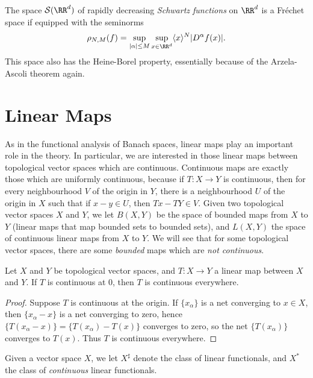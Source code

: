 \begin{example}
    The space $\mathcal{S}(\RR^d)$ of rapidly decreasing \emph{Schwartz functions} on $\RR^d$ is a Fr\'{e}chet space if equipped with the seminorms
    \[ \rho_{N,M}(f) = \sup_{|\alpha| \leq M} \sup_{x \in \RR^d} \langle x \rangle^N |D^\alpha f(x)|. \]
    This space also has the Heine-Borel property, essentially because of the Arzela-Ascoli theorem again.
\end{example}







\section{Linear Maps}

As in the functional analysis of Banach spaces, linear maps play an important role in the theory. In particular, we are interested in those linear maps between topological vector spaces which are continuous. Continuous maps are exactly those which are uniformly continuous, because if $T: X \to Y$ is continuous, then for every neighbourhood $V$ of the origin in $Y$, there is a neighbourhood $U$ of the origin in $X$ such that if $x - y \in U$, then $Tx - TY \in V$. Given two topological vector spaces $X$ and $Y$, we let $B(X,Y)$ be the space of bounded maps from $X$ to $Y$ (linear maps that map bounded sets to bounded sets), and $L(X,Y)$ the space of continuous linear maps from $X$ to $Y$. We will see that for some topological vector spaces, there are some \emph{bounded} maps which are \emph{not continuous}.

\begin{lemma}
    Let $X$ and $Y$ be topological vector spaces, and $T: X \to Y$ a linear map between $X$ and $Y$.  If $T$ is continuous at $0$, then $T$ is continuous everywhere.
\end{lemma}
\begin{proof}
    Suppose $T$ is continuous at the origin. If $\{ x_\alpha \}$ is a net converging to $x \in X$, then $\{ x_\alpha - x \}$ is a net converging to zero, hence $\{ T(x_\alpha - x) \} = \{ T(x_\alpha) - T(x) \}$ converges to zero, so the net $\{ T(x_\alpha) \}$ converges to $T(x)$. Thus $T$ is continuous everywhere.
\end{proof}

Given a vector space $X$, we let $X^\sharp$ denote the class of linear functionals, and $X^*$ the class of {\it continuous} linear functionals.

